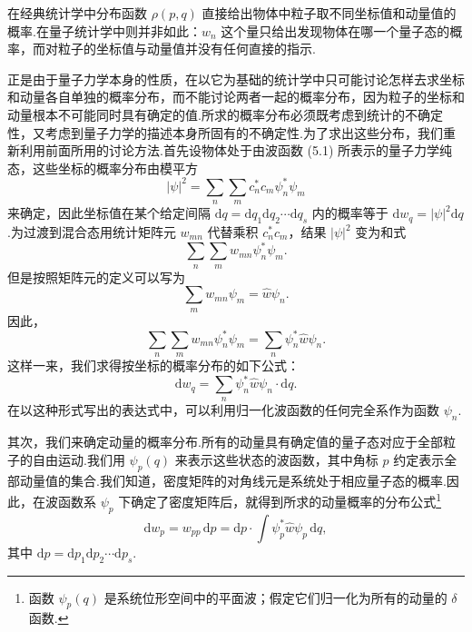 在经典统计学中分布函数 $\rho(p,q)$ 直接给出物体中粒子取不同坐标值和动量值的概率.在量子统计学中则并非如此：$w_n$ 这个量只给出发现物体在哪一个量子态的概率，而对粒子的坐标值与动量值并没有任何直接的指示.

正是由于量子力学本身的性质，在以它为基础的统计学中只可能讨论怎样去求坐标和动量各自单独的概率分布，而不能讨论两者一起的概率分布，因为粒子的坐标和动量根本不可能同时具有确定的值.所求的概率分布必须既考虑到统计的不确定性，又考虑到量子力学的描述本身所固有的不确定性.为了求出这些分布，我们重新利用前面所用的讨论方法.首先设物体处于由波函数 (5.1) 所表示的量子力学纯态，这些坐标的概率分布由模平方
\begin{equation*}
  |\psi|^2=\sum_n\sum_m c_n^{*}c_m\psi_n^{*}\psi_m
\end{equation*}
来确定，因此坐标值在某个给定间隔 $\mathrm{d}q=\mathrm{d}q_1\mathrm{d}q_2\cdots\mathrm{d}q_s$ 内的概率等于 $\mathrm{d}w_q=|\psi|^2\mathrm{d}q$.为过渡到混合态用统计矩阵元 $w_{mn}$ 代替乘积 $c_n^{*}c_m$，结果 $|\psi|^2$ 变为和式
\begin{equation*}
  \sum_n\sum_m w_{mn}\psi_n^{*}\psi_m.
\end{equation*}
但是按照矩阵元的定义可以写为
\begin{equation*}
  \sum_m w_{mn}\psi_m=\hat{w}\psi_n.
\end{equation*}
因此，
\begin{equation*}
  \sum_n\sum_m w_{mn}\psi_n^{*}\psi_m
  =\sum_n\psi_n^{*}\hat{w}\psi_n.
\end{equation*}
这样一来，我们求得按坐标的概率分布的如下公式：
\begin{equation}
  \mathrm{d}w_q=\sum_n\psi_n^{*}\hat{w}\psi_n\cdot\mathrm{d}q.
\end{equation}
在以这种形式写出的表达式中，可以利用归一化波函数的任何完全系作为函数 $\psi_n$.

其次，我们来确定动量的概率分布.所有的动量具有确定值的量子态对应于全部粒子的自由运动.我们用 $\psi_p(q)$ 来表示这些状态的波函数，其中角标 $p$ 约定表示全部动量值的集合.我们知道，密度矩阵的对角线元是系统处于相应量子态的概率.因此，在波函数系 $\psi_p$ 下确定了密度矩阵后，就得到所求的动量概率的分布公式\footnote{函数 $\psi_p(q)$ 是系统位形空间中的平面波；假定它们归一化为所有的动量的 $\delta$ 函数.}
\begin{equation}
  \mathrm{d}w_p=w_{pp}\,\mathrm{d}p
  =\mathrm{d}p\cdot\int\psi_p^{*}\hat{w}\psi_p\,\mathrm{d}q,
\end{equation}
其中 $\mathrm{d}p=\mathrm{d}p_1\mathrm{d}p_2\cdots\mathrm{d}p_s$.

